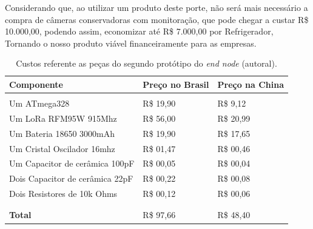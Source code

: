 Considerando que, ao utilizar um produto deste porte, não será mais necessário a compra de câmeras conservadoras com monitoração,  que pode chegar a custar R\$ 10.000,00, podendo assim, economizar até R\$ 7.000,00 por Refrigerador, Tornando o nosso produto viável financeiramente para as empresas.

\begin{table}[H]
  \centering 
  \scalebox{1} {
    \begin{tabular}{l | l | l}
    \textbf{Componente}&\textbf{Preço no Brasil}&\textbf{Preço na China}\\[5pt] \hline
    &&\\
    Um ATmega328&R\$ 19,90&R\$ 9,12 \\[5pt]
    Um LoRa RFM95W 915Mhz&R\$ 56,00&R\$ 20,99 \\[5pt]
    Um Bateria 18650 3000mAh&R\$ 19,90 &R\$ 17,65 \\[5pt]
    Um Cristal Oscilador 16mhz&R\$ 01,47&R\$ 00,46 \\[5pt]
    Um Capacitor de cerâmica 100pF&R\$ 00,05&R\$ 00,04 \\[5pt]
    Dois Capacitor de cerâmica 22pF&R\$ 00,22&R\$ 00,08 \\[5pt]
    Dois Resistores de 10k Ohms&R\$ 00,12&R\$ 00,06 \\
    &&\\ \hline
    &&\\
    \textbf{Total}&R\$ 97,66&R\$ 48,40 \\[5pt]
    \end{tabular}
  }
  \caption{Custos referente as peças do segundo protótipo do \textit{end node} (autoral).}
  \label{tab:costs-2-proto}
\end{table}
  